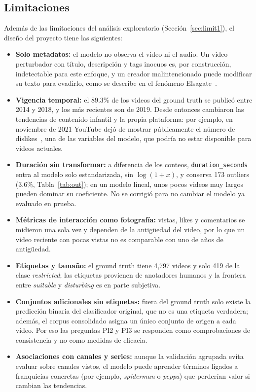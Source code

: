 \documentclass[conference]{IEEEtran}
\begin{document}
\subsection{Limitaciones}\label{sec:limit2}
Además de las limitaciones del análisis exploratorio (Sección~\ref{sec:limit1}), el diseño del proyecto tiene las siguientes:
\begin{itemize}
\item \textbf{Solo metadatos:} el modelo no observa el video ni el audio. Un video perturbador con título, descripción y tags inocuos es, por construcción, indetectable para este enfoque, y un creador malintencionado puede modificar su texto para evadirlo, como se describe en el fenómeno Elsagate~\cite{uscm}.
\item \textbf{Vigencia temporal:} el 89.3\% de los videos del ground truth se publicó entre 2014 y 2018, y los más recientes son de 2019. Desde entonces cambiaron las tendencias de contenido infantil y la propia plataforma: por ejemplo, en noviembre de 2021 YouTube dejó de mostrar públicamente el número de dislikes~\cite{ytdislikes}, una de las variables del modelo, que podría no estar disponible para videos actuales.
\item \textbf{Duración sin transformar:} a diferencia de los conteos, \texttt{duration\_seconds} entra al modelo solo estandarizada, sin $\log(1+x)$, y conserva 173 outliers (3.6\%, Tabla~\ref{tab:out}); en un modelo lineal, unos pocos videos muy largos pueden dominar su coeficiente. No se corrigió para no cambiar el modelo ya evaluado en prueba.
\item \textbf{Métricas de interacción como fotografía:} vistas, likes y comentarios se midieron una sola vez y dependen de la antigüedad del video, por lo que un video reciente con pocas vistas no es comparable con uno de años de antigüedad.
\item \textbf{Etiquetas y tamaño:} el ground truth tiene 4,797 videos y solo 419 de la clase \textit{restricted}; las etiquetas provienen de anotadores humanos y la frontera entre \textit{suitable} y \textit{disturbing} es en parte subjetiva.
\item \textbf{Conjuntos adicionales sin etiquetas:} fuera del ground truth solo existe la predicción binaria del clasificador original, que no es una etiqueta verdadera; además, el corpus consolidado asigna un único conjunto de origen a cada video. Por eso las preguntas PI2 y PI3 se responden como comprobaciones de consistencia y no como medidas de eficacia.
\item \textbf{Asociaciones con canales y series:} aunque la validación agrupada evita evaluar sobre canales vistos, el modelo puede aprender términos ligados a franquicias concretas (por ejemplo, \textit{spiderman} o \textit{peppa}) que perderían valor si cambian las tendencias.
\end{itemize}
\end{document}
